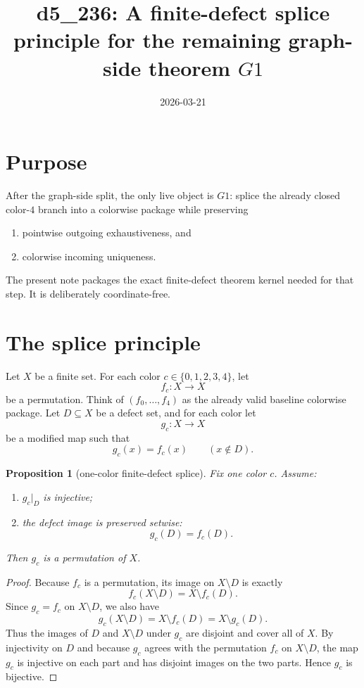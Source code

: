 \documentclass[11pt]{article}
\title{d5\_236: A finite-defect splice principle for the remaining graph-side theorem \(G1\)}
\author{}
\date{2026-03-21}
\newtheorem{proposition}[theorem]{Proposition}
\begin{document}
\maketitle

\section{Purpose}
After the graph-side split, the only live object is \(G1\): splice the already
closed color-$4$ branch into a colorwise package while preserving
\begin{enumerate}[label=\textup{(\arabic*)},leftmargin=2.8em]
\item pointwise outgoing exhaustiveness, and
\item colorwise incoming uniqueness.
\end{enumerate}
The present note packages the exact finite-defect theorem kernel needed for that
step.
It is deliberately coordinate-free.

\section{The splice principle}
Let \(X\) be a finite set.
For each color \(c\in\{0,1,2,3,4\}\), let
\[
 f_c\colon X\to X
\]
be a permutation.
Think of \((f_0,\dots,f_4)\) as the already valid baseline colorwise package.
Let \(D\subseteq X\) be a defect set, and for each color let
\[
 g_c\colon X\to X
\]
be a modified map such that
\[
 g_c(x)=f_c(x)\qquad (x\notin D).
\]

\begin{proposition}[one-color finite-defect splice]
\label{prop:one-color-splice}
Fix one color \(c\).
Assume:
\begin{enumerate}[label=\textup{(\arabic*)},leftmargin=2.8em]
\item \(g_c\vert_D\) is injective;
\item the defect image is preserved setwise:
      \[
      g_c(D)=f_c(D).
      \]
\end{enumerate}
Then \(g_c\) is a permutation of \(X\).
\end{proposition}

\begin{proof}
Because \(f_c\) is a permutation, its image on \(X\setminus D\) is exactly
\[
 f_c(X\setminus D)=X\setminus f_c(D).
\]
Since \(g_c=f_c\) on \(X\setminus D\), we also have
\[
 g_c(X\setminus D)=X\setminus f_c(D)=X\setminus g_c(D).
\]
Thus the images of \(D\) and \(X\setminus D\) under \(g_c\) are disjoint and
cover all of \(X\).
By injectivity on \(D\) and because \(g_c\) agrees with the permutation \(f_c\)
on \(X\setminus D\), the map \(g_c\) is injective on each part and has disjoint
images on the two parts.
Hence \(g_c\) is bijective.
\end{proof}
\end{document}
